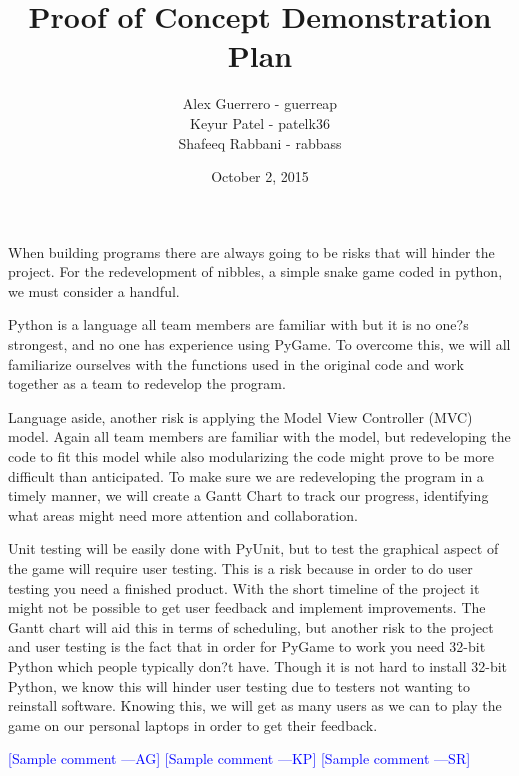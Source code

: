 \documentclass[12pt]{article}
\newcommand{\authornote}[3]{\textcolor{#1}{[#3 ---#2]}}
\newcommand{\authornote}[3]{}
\newcommand{\ag}[1]{\authornote{blue}{AG}{#1}} %
\newcommand{\kp}[1]{\authornote{blue}{KP}{#1}} %
\newcommand{\sr}[1]{\authornote{blue}{SR}{#1}} %
\begin{document}
\title{Proof of Concept Demonstration Plan} 
\author{Alex Guerrero - guerreap\\Keyur Patel - patelk36\\Shafeeq Rabbani - rabbass}
\date{October 2, 2015}
	
\maketitle
	When building programs there are always going to be risks that will hinder the project. For the redevelopment of nibbles, a simple snake game coded in python, we must consider a handful.\par
	Python is a language all team members are familiar with but it is no one?s strongest, and no one has experience using PyGame. To overcome this, we will all familiarize ourselves with the functions used in the original code and work together as a team to redevelop the program.\par
	Language aside, another risk is applying the Model View Controller (MVC) model. Again all team members are familiar with the model, but redeveloping the code to fit this model while also modularizing the code might prove to be more difficult than anticipated. To make sure we are redeveloping the program in a timely manner, we will create a Gantt Chart to track our progress, identifying what areas might need more attention and collaboration.\par
	Unit testing will be easily done with PyUnit, but to test the graphical aspect of the game will require user testing. This is a risk because in order to do user testing you need a finished product. With the short timeline of the project it might not be possible to get user feedback and implement improvements. The Gantt chart will aid this in terms of scheduling, but another risk to the project and user testing is the fact that in order for PyGame to work you need 32-bit Python which people typically don?t have. Though it is not hard to install 32-bit Python, we know this will hinder user testing due to testers not wanting to reinstall software. Knowing this, we will get as many users as we can to play the game on our personal laptops in order to get their feedback.\par


\ag{Sample comment}
\kp{Sample comment}
\sr{Sample comment}
\end{document}
